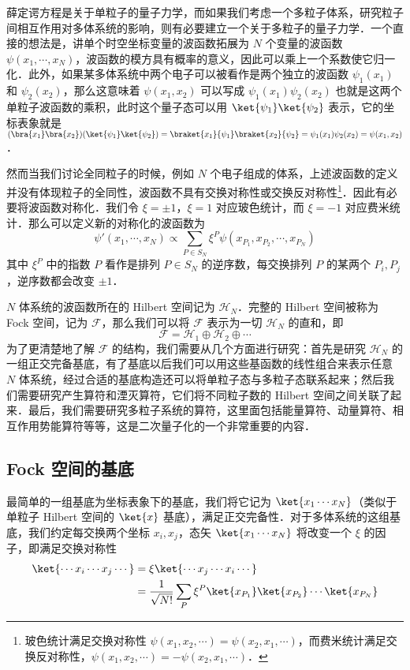 

薛定谔方程是关于单粒子的量子力学，而如果我们考虑一个多粒子体系，研究粒子间相互作用对多体系统的影响，则有必要建立一个关于多粒子的量子力学．一个直接的想法是，讲单个时空坐标变量的波函数拓展为 $N$ 个变量的波函数 $\psi(x_1,\cdots,x_N)$，波函数的模方具有概率的意义，因此可以乘上一个系数使它归一化．此外，如果某多体系统中两个电子可以被看作是两个独立的波函数 $\psi_1(x_1)$ 和 $\psi_2(x_2)$，那么这意味着 $\psi(x_1,x_2)$ 可以写成 $\psi_1(x_1)\psi_2(x_2)$ 也就是这两个单粒子波函数的乘积，此时这个量子态可以用 $\ket{\psi_1}\ket{\psi_2}$ 表示，它的坐标表象就是 $(\bra{x_1}\bra{x_2})(\ket{\psi_1}\ket{\psi_2})=\braket{x_1}{\psi_1} \braket{x_2}{\psi_2}=\psi_1(x_1)\psi_2(x_2)=\psi(x_1,x_2)$．

然而当我们讨论全同粒子的时候，例如 $N$ 个电子组成的体系，上述波函数的定义并没有体现粒子的全同性，波函数不具有交换对称性或交换反对称性\footnote{玻色统计满足交换对称性 $\psi(x_1,x_2,\cdots)=\psi(x_2,x_1,\cdots)$，而费米统计满足交换反对称性，$\psi(x_1,x_2,\cdots)=-\psi(x_2,x_1,\cdots)$．}．因此有必要将波函数对称化．我们令 $\xi=\pm 1$，$\xi=1$ 对应玻色统计，而 $\xi=-1$ 对应费米统计．那么可以定义新的对称化的波函数为
\begin{equation}
\psi'(x_1,\cdots,x_N)\propto \sum_{P\in S_N} \xi^P \psi(x_{P_1},x_{P_2},\cdots,x_{P_N})
\end{equation}
其中 $\xi^P$ 中的指数 $P$ 看作是排列 $P\in S_N$ 的逆序数，每交换排列 $P$ 的某两个 $P_i,P_j$，逆序数都会改变 $\pm 1$．

$N$ 体系统的波函数所在的 Hilbert 空间记为 $\mathcal{H}_N$．完整的 Hilbert 空间被称为 Fock 空间，记为 $\mathcal{F}$，那么我们可以将 $\mathcal{F}$ 表示为一切 $\mathcal{H}_N$ 的直和，即
\begin{equation}
\mathcal{F}=\mathcal{H}_1 \oplus \mathcal{H}_2 \oplus \cdots
\end{equation}
为了更清楚地了解 $\mathcal{F}$ 的结构，我们需要从几个方面进行研究：首先是研究 $\mathcal{H}_N$ 的一组正交完备基底，有了基底以后我们可以用这些基函数的线性组合来表示任意 $N$ 体系统，经过合适的基底构造还可以将单粒子态与多粒子态联系起来；然后我们需要研究产生算符和湮灭算符，它们将不同粒子数的 Hilbert 空间之间关联了起来．最后，我们需要研究多粒子系统的算符，这里面包括能量算符、动量算符、相互作用势能算符等等，这是二次量子化的一个非常重要的内容．
\subsection{Fock 空间的基底}
最简单的一组基底为坐标表象下的基底，我们将它记为 $\ket{x_1\cdots x_N}$（类似于单粒子 Hilbert 空间的 $\ket{x}$ 基底），满足正交完备性．对于多体系统的这组基底，我们约定每交换两个坐标 $x_i,x_j$，态矢 $\ket{x_1\cdots x_N}$ 将改变一个 $\xi$ 的因子，即满足交换对称性
\begin{equation}
\begin{aligned}
\ket{\cdots x_i \cdots x_j \cdots}& =
\xi \ket{\cdots x_j \cdots x_i \cdots} \\
&=\frac{1}{\sqrt{N!}}\sum_P \xi^P\ket{x_{P_1}}\ket{x_{P_2}}\cdots\ket{x_{P_N}}
\end{aligned}
\end{equation}

